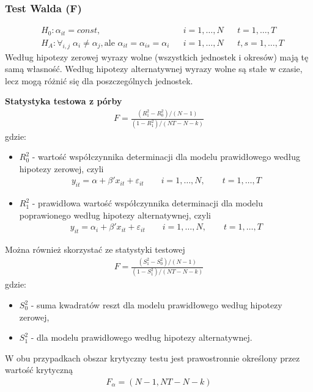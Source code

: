 \subsubsection{Test Walda (F)}
\begin{align*}
&H_0:\alpha_{it}=const,&&i=1,\dots,N&&t=1,\dots,T\\
&H_A:\forall_{i,j}\;\alpha_i\neq\alpha_j, \text{ale }\alpha_{it}=\alpha_{is}=\alpha_i&&i=1,\dots,N&&t,s=1,\dots,T
\end{align*}
Według hipotezy zerowej wyrazy wolne (wszystkich jednostek i okresów) mają tę samą własność. Według hipotezy alternatywnej wyrazy wolne są stałe w czasie, lecz mogą różnić się dla poszczególnych jednostek.

\textbf{Statystyka testowa z pórby}
\begin{gather*}
F=\frac{(R_1^2-R_0^2)/(N-1)}{(1-R_1^2)/(NT-N-k)}
\end{gather*}
gdzie:
\begin{itemize}
\item $ R_0^2 $ - wartość współczynnika determinacji dla modelu prawidłowego według hipotezy zerowej, czyli
\begin{gather*}
y_{it}=\alpha+\beta'x_{it}+\varepsilon_{it}\qquad i=1,\dots,N,\qquad t=1,\dots,T
\end{gather*}
\item $ R_1^2 $ - prawidłowa wartość współczynnika determinacji dla modelu poprawionego według hipotezy alternatywnej, czyli
\begin{gather*}
y_{it}=\alpha_i+\beta'x_{it}+\varepsilon_{it}\qquad i=1,\dots,N,\qquad t=1,\dots,T
\end{gather*}
\end{itemize}
Można również skorzystać ze statystyki testowej
\begin{gather*}
F=\frac{(S_1^2-S_0^2)/(N-1)}{(1-S_1^2)/(NT-N-k)}
\end{gather*}
gdzie:
\begin{itemize}
\item $ S_0^2 $ - suma kwadratów reszt dla modelu prawidłowego według hipotezy zerowej,
\item $ S_1^2 $ - dla modelu prawidłowego według hipotezy alternatywnej.
\end{itemize}
W obu przypadkach obszar krytyczny testu jest prawostronnie określony przez wartość krytyczną
\begin{gather*}
F_\alpha=(N-1,NT-N-k)
\end{gather*}
